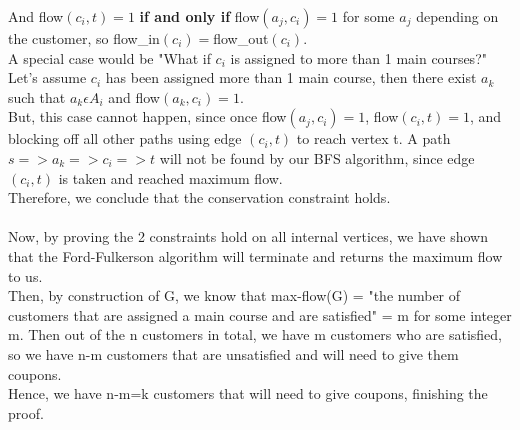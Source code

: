 \documentclass{assignment-373}
\begin{document}
\begin{enumerate}
    \phantom{=} \phantom{=} \phantom{=} And flow$(c_i,t)=1$ \textbf{if and only if} flow$(a_j,c_i)=1$ for some $a_j$ depending on the customer, so flow\_in$(c_i)=$flow\_out$(c_i)$.\\
    \phantom{=} \phantom{=} \phantom{=} A special case would be "What if $c_i$ is assigned to more than 1 main courses?"\\
    \phantom{=} \phantom{=} \phantom{=} Let's assume $c_i$ has been assigned more than 1 main course, then there exist $a_k$ such that $a_k\epsilon A_i$ and flow$(a_k,c_i)=1$.\\
    \phantom{=} \phantom{=} \phantom{=} But, this case cannot happen, since once flow$(a_j,c_i)=1$, flow$(c_i,t)=1$, and blocking off all other paths using edge $(c_i,t)$ to reach vertex t. A path $s=>a_k=>c_i=>t$ will not be found by our BFS algorithm, since edge $(c_i,t)$ is taken and reached maximum flow.\\
    \phantom{=} \phantom{=} \phantom{=} Therefore, we conclude that the conservation constraint holds.\\
    \\
    Now, by proving the 2 constraints hold on all internal vertices, we have shown that the Ford-Fulkerson algorithm will terminate and returns the maximum flow to us.\\
    
    \phantom{=} \phantom{=} Then, by construction of G, we know that max-flow(G) = "the number of customers that are assigned a main course and are satisfied" = m for some integer m. Then out of the n customers in total, we have m customers who are satisfied, so we have n-m customers that are unsatisfied and will need to give them coupons.\\
    \phantom{=} \phantom{=} Hence, we have n-m=k customers that will need to give coupons, finishing the proof.\\
    

\end{enumerate}
\end{document}
